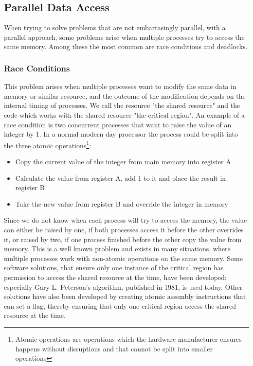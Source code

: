 \subsection{Parallel Data Access}
When trying to solve problems that are not embarrasingly parallel, with a parallel approach, some problems arise when multiple processes try to access the same memory. Among these the most common are race conditions and deadlocks.

\subsubsection{Race Conditions}
This problem arises when multiple processes want to modify the same data in memory or similar resource, and the outcome of the modification depends on the internal timing of processes. We call the resource "the shared resource" and the code which works with the shared resource "the critical region". An example of a race condition is two concurrent processes that want to raise the value of an integer by 1. In a normal modern day processor the process could be split into the three atomic operations\footnote{Atomic operations are operations which the hardware manufacturer ensures happens without disruptions and that cannot be split into smaller operations}:

\begin{itemize}
\item Copy the current value of the integer from main memory into register A
\item Calculate the value from register A, add 1 to it and place the result in register B
\item Take the new value from register B and override the integer in memory
\end{itemize}

Since we do not know when each process will try to access the memory, the value can either be raised by one, if both processes access it before the other overrides it, or raised by two, if one process finished before the other copy the value from memory. This is a well known problem and exists in many situations, where multiple processes work with non-atomic operations on the same memory. Some software solutions, that ensure only one instance of the critical region has permission to access the shared resource at the time, have been developed; especially Gary L. Peterson's algorithm, published in 1981, is used today. Other solutions have also been developed by creating atomic assembly instructions that can set a flag, thereby ensuring that only one critical region access the shared resource at the time.

